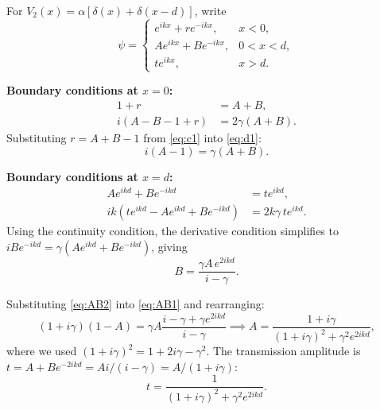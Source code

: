 \documentclass[a4paper,11pt]{article}
\begin{document}
For $V_2(x) = \alpha[\delta(x) + \delta(x-d)]$, write
\begin{equation}
    \psi = \begin{cases}
        e^{ikx} + re^{-ikx}, & x < 0, \\
        Ae^{ikx} + Be^{-ikx}, & 0 < x < d, \\
        te^{ikx}, & x > d.
    \end{cases}
\end{equation}

\noindent\textbf{Boundary conditions at $x = 0$:}
\begin{align}
    1 + r &= A + B, \label{eq:c1}\\
    i(A - B - 1 + r) &= 2\gamma(A + B). \label{eq:d1}
\end{align}
Substituting $r = A + B - 1$ from \eqref{eq:c1} into \eqref{eq:d1}:
\begin{equation}
    i(A - 1) = \gamma(A + B). \label{eq:AB1}
\end{equation}

\noindent\textbf{Boundary conditions at $x = d$:}
\begin{align}
    Ae^{ikd} + Be^{-ikd} &= te^{ikd}, \\
    ik(te^{ikd} - Ae^{ikd} + Be^{-ikd}) &= 2k\gamma\, te^{ikd}.
\end{align}
Using the continuity condition, the derivative condition simplifies to $iBe^{-ikd} = \gamma(Ae^{ikd} + Be^{-ikd})$, giving
\begin{equation}
    B = \frac{\gamma A\, e^{2ikd}}{i - \gamma}. \label{eq:AB2}
\end{equation}

Substituting \eqref{eq:AB2} into \eqref{eq:AB1} and rearranging:
\begin{equation}
    (1+i\gamma)(1 - A) = \gamma A \frac{i - \gamma + \gamma e^{2ikd}}{i - \gamma} \implies A = \frac{1 + i\gamma}{(1+i\gamma)^2 + \gamma^2 e^{2ikd}},
\end{equation}
where we used $(1+i\gamma)^2 = 1 + 2i\gamma - \gamma^2$. The transmission amplitude is $t = A + Be^{-2ikd} = Ai/(i-\gamma) = A/(1+i\gamma)$:
\begin{equation}
    t = \frac{1}{(1 + i\gamma)^2 + \gamma^2 e^{2ikd}}.
\end{equation}
\end{document}
